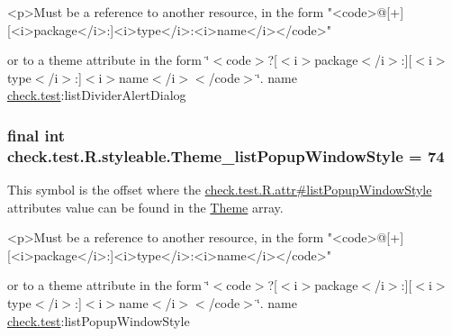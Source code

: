 \begin{DoxyVerb}      <p>Must be a reference to another resource, in the form "<code>@[+][<i>package</i>:]<i>type</i>:<i>name</i></code>"
\end{DoxyVerb}
 or to a theme attribute in the form \char`\"{}$<$code$>$?\mbox{[}$<$i$>$package$<$/i$>$\+:\mbox{]}\mbox{[}$<$i$>$type$<$/i$>$\+:\mbox{]}$<$i$>$name$<$/i$>$$<$/code$>$\char`\"{}.  name \hyperlink{namespacecheck_1_1test}{check.\+test}\+:list\+Divider\+Alert\+Dialog \hypertarget{classcheck_1_1test_1_1_r_1_1styleable_a43cec80892caa72b4d7185ffbe3950f9}{}
\subsubsection[{Theme\+\_\+list\+Popup\+Window\+Style}]{\setlength{\rightskip}{0pt plus 5cm}final int check.\+test.\+R.\+styleable.\+Theme\+\_\+list\+Popup\+Window\+Style = 74\hspace{0.3cm}{\ttfamily [static]}}\label{classcheck_1_1test_1_1_r_1_1styleable_a43cec80892caa72b4d7185ffbe3950f9}
This symbol is the offset where the \hyperlink{classcheck_1_1test_1_1_r_1_1attr_a41c863e947df5917e6718786a094a95d}{check.\+test.\+R.\+attr\#list\+Popup\+Window\+Style} attribute\textquotesingle{}s value can be found in the \hyperlink{classcheck_1_1test_1_1_r_1_1styleable_acca726d02016a0cf607782ec3a436a81}{Theme} array.

\begin{DoxyVerb}      <p>Must be a reference to another resource, in the form "<code>@[+][<i>package</i>:]<i>type</i>:<i>name</i></code>"
\end{DoxyVerb}
 or to a theme attribute in the form \char`\"{}$<$code$>$?\mbox{[}$<$i$>$package$<$/i$>$\+:\mbox{]}\mbox{[}$<$i$>$type$<$/i$>$\+:\mbox{]}$<$i$>$name$<$/i$>$$<$/code$>$\char`\"{}.  name \hyperlink{namespacecheck_1_1test}{check.\+test}\+:list\+Popup\+Window\+Style \hypertarget{classcheck_1_1test_1_1_r_1_1styleable_ab8d78a772c83aad6fa1b020d5f846f67}{}

